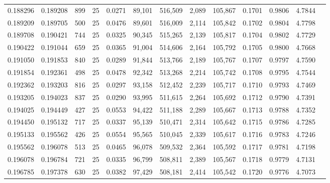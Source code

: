 \begin{tabular}{rrrrrrrrrrrrr}
0.188296 & 0.189208 &   899 &  25 &                                     0.0271 &  89,101 & 516,509 &   2,089 & 105,867 & 0.1701 & 0.9806 & 4.7844 \\
0.189209 & 0.189705 &   500 &  25 &                                     0.0476 &  89,601 & 516,009 &   2,114 & 105,842 & 0.1702 & 0.9804 & 4.7798 \\
0.189708 & 0.190421 &   744 &  25 &                                     0.0325 &  90,345 & 515,265 &   2,139 & 105,817 & 0.1704 & 0.9802 & 4.7729 \\
0.190422 & 0.191044 &   659 &  25 &                                     0.0365 &  91,004 & 514,606 &   2,164 & 105,792 & 0.1705 & 0.9800 & 4.7668 \\
0.191050 & 0.191853 &   840 &  25 &                                     0.0289 &  91,844 & 513,766 &   2,189 & 105,767 & 0.1707 & 0.9797 & 4.7590 \\
0.191854 & 0.192361 &   498 &  25 &                                     0.0478 &  92,342 & 513,268 &   2,214 & 105,742 & 0.1708 & 0.9795 & 4.7544 \\
0.192362 & 0.193203 &   816 &  25 &                                     0.0297 &  93,158 & 512,452 &   2,239 & 105,717 & 0.1710 & 0.9793 & 4.7469 \\
0.193205 & 0.194023 &   837 &  25 &                                     0.0290 &  93,995 & 511,615 &   2,264 & 105,692 & 0.1712 & 0.9790 & 4.7391 \\
0.194025 & 0.194449 &   427 &  25 &                                     0.0553 &  94,422 & 511,188 &   2,289 & 105,667 & 0.1713 & 0.9788 & 4.7352 \\
0.194450 & 0.195132 &   717 &  25 &                                     0.0337 &  95,139 & 510,471 &   2,314 & 105,642 & 0.1715 & 0.9786 & 4.7285 \\
0.195133 & 0.195562 &   426 &  25 &                                     0.0554 &  95,565 & 510,045 &   2,339 & 105,617 & 0.1716 & 0.9783 & 4.7246 \\
0.195562 & 0.196078 &   513 &  25 &                                     0.0465 &  96,078 & 509,532 &   2,364 & 105,592 & 0.1717 & 0.9781 & 4.7198 \\
0.196078 & 0.196784 &   721 &  25 &                                     0.0335 &  96,799 & 508,811 &   2,389 & 105,567 & 0.1718 & 0.9779 & 4.7131 \\
0.196785 & 0.197378 &   630 &  25 &                                     0.0382 &  97,429 & 508,181 &   2,414 & 105,542 & 0.1720 & 0.9776 & 4.7073 \\

\end{tabular}
